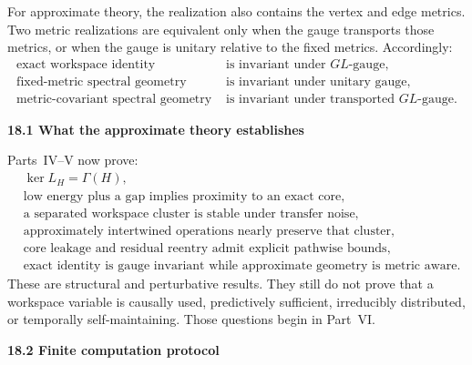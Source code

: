 \documentclass[11pt,letterpaper]{article}
\newcommand{\subtopic}[1]{%
 \vspace{0.45em}
 {\bfseries\color{AccentColor} #1\par}
}
\theoremstyle{plain}
\theoremstyle{definition}
\begin{document}
For approximate theory, the realization also contains the vertex and edge
metrics. Two metric realizations are equivalent only when the gauge transports
those metrics, or when the gauge is unitary relative to the fixed metrics.
Accordingly:
\[
\boxed{
\begin{aligned}
\text{exact workspace identity}
&\text{ is invariant under }GL\text{-gauge},\\
\text{fixed-metric spectral geometry}
&\text{ is invariant under unitary gauge},\\
\text{metric-covariant spectral geometry}
&\text{ is invariant under transported }GL\text{-gauge}.
\end{aligned}
}
\]

\clearpage
\subtopic{18.1 What the approximate theory establishes}

Parts~IV--V now prove:
\[
\begin{aligned}
&\ker L_H=\Gamma(H),\\
&\text{low energy plus a gap implies proximity to an exact core},\\
&\text{a separated workspace cluster is stable under transfer noise},\\
&\text{approximately intertwined operations nearly preserve that cluster},\\
&\text{core leakage and residual reentry admit explicit pathwise bounds},\\
&\text{exact identity is gauge invariant while approximate geometry is metric aware}.
\end{aligned}
\]
These are structural and perturbative results. They still do not prove that a
workspace variable is causally used, predictively sufficient, irreducibly
distributed, or temporally self-maintaining. Those questions begin in
Part~VI.

\subtopic{18.2 Finite computation protocol}
\end{document}
